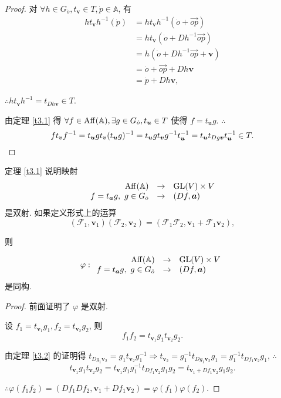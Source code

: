 \documentclass{ctexart}
\begin{document}
\begin{proof}
    对 $\forall h\in G_{\dot{o}},t_{\boldsymbol{v}}\in T,\dot{p}\in\mathbb{A}$, 有
    \begin{align*}
        ht_{\boldsymbol{v}}h^{-1}(\dot{p}) & =ht_{\boldsymbol{v}}h^{-1}(\dot{o}+\overrightarrow{op}) \\
        & =ht_{\boldsymbol{v}}(\dot{o}+Dh^{-1}\overrightarrow{op}) \\
        & =h(\dot{o}+Dh^{-1}\overrightarrow{op}+\boldsymbol{v}) \\
        & =\dot{o}+\overrightarrow{op}+Dh\boldsymbol{v} \\
        & =\dot{p}+Dh\boldsymbol{v},
    \end{align*}

    $\therefore ht_{\boldsymbol{v}}h^{-1}=t_{Dh\boldsymbol{v}}\in T$.

    由定理 \ref{t3.1} 得 $\forall f\in\operatorname{Aff} (\mathbb{A}),\exists g\in G_{\dot{o}},t_{\boldsymbol{u}}\in T$ 使得 $f=t_{\boldsymbol{u}}g$. $\therefore$
    \[ft_{\boldsymbol{v}}f^{-1}=t_{\boldsymbol{u}}gt_{\boldsymbol{v}}(t_{\boldsymbol{u}}g)^{-1}=t_{\boldsymbol{u}}gt_{\boldsymbol{v}}g^{-1}t_{\boldsymbol{u}}^{-1}=t_{\boldsymbol{u}}t_{Dg\boldsymbol{v}}t_{\boldsymbol{u}}^{-1}\in T.\qedhere\]
\end{proof}
定理 \ref{t3.1} 说明映射
\[\begin{array}{rcl}
    \operatorname{Aff} (\mathbb{A}) & \to & \operatorname{GL} (V)\times V \\
    f=t_{\boldsymbol{a}}g,\ g\in G_{\dot{o}} & \to & (Df,\boldsymbol{a}) \\
\end{array}\]
是双射. 如果定义形式上的运算
\[(\mathcal{F}_1,\boldsymbol{v}_1)(\mathcal{F}_2,\boldsymbol{v}_2)=(\mathcal{F}_1\mathcal{F}_2,\boldsymbol{v}_1+\mathcal{F}_1\boldsymbol{v}_2),\]

则
\begin{theorem}\label{t3.3}
    \[\varphi:\begin{array}{rcl}
        \operatorname{Aff} (\mathbb{A}) & \to & \operatorname{GL} (V)\times V \\
        f=t_{\boldsymbol{a}}g,\ g\in G_{\dot{o}} & \to & (Df,\boldsymbol{a}) \\
    \end{array}\]
    是同构.
\end{theorem}
\begin{proof}
    前面证明了 $\varphi$ 是双射.

    设 $f_1=t_{\boldsymbol{v}_1}g_1,f_2=t_{\boldsymbol{v}_2}g_2$, 则
    \[f_1f_2=t_{\boldsymbol{v}_1}g_1t_{\boldsymbol{v}_2}g_2.\]

    由定理 \ref{t3.2} 的证明得 $t_{Dg_1\boldsymbol{v}_2}=g_1t_{\boldsymbol{v}_2}g_1^{-1}\Rightarrow t_{\boldsymbol{v}_2}=g_1^{-1}t_{Dg_1\boldsymbol{v}_2}g_1=g_1^{-1}t_{Df_1\boldsymbol{v}_2}g_1$, $\therefore$
    \[t_{\boldsymbol{v}_1}g_1t_{\boldsymbol{v}_2}g_2=t_{\boldsymbol{v}_1}g_1g_1^{-1}t_{Df_1\boldsymbol{v}_2}g_1g_2=t_{\boldsymbol{v}_1+Df_1\boldsymbol{v}_2}g_1g_2.\]

    $\therefore\varphi(f_1f_2)=(Df_1Df_2,\boldsymbol{v}_1+Df_1\boldsymbol{v}_2)=\varphi(f_1)\varphi(f_2)$.
\end{proof}
\end{document}
